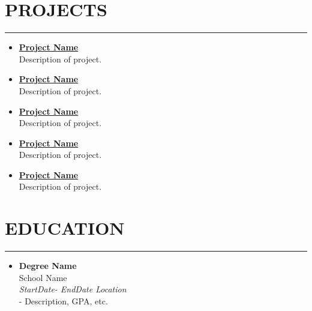\documentclass[11 pt, a4paper, usenames, dvipsnames]{article}
\newcommand*{\RoleFont}{%
      \fontsize{14}{8}%
\color{Black}%
\bf
      \selectfont}
\newcommand*{\DateFont}{%
      \fontsize{10}{8}%
\color{Gray}%
\it
      \selectfont}
\newcommand*{\SectionFont}{%
      \fontsize{16}{5}%
\color{CV_Color}%
\bf
\selectfont}
\begin{document}
\begin{paracol}{2}
\section*{\SectionFont\faPaperPlane\enskip PROJECTS}\vspace{-15pt}
\par\noindent\rule{0.18\textwidth}{0.4pt}\vspace{-1pt}

\begin{itemize}[leftmargin=0pt,align=left,labelwidth=\parindent,labelsep=0pt]

\item[] \href{https://github.com/}{\textbf{Project Name}} \verb||\faGithub\enskip \\ 
Description of project.

\item[] \href{https://github.com/}{\textbf{Project Name}} \verb||\faGithub\enskip \\ 
Description of project.

\item[] \href{https://github.com/}{\textbf{Project Name}} \verb||\faGithub\enskip \\ 
Description of project.

\item[] \href{https://github.com/}{\textbf{Project Name}} \verb||\faGithub\enskip \\ 
Description of project.

\item[] \href{https://github.com/}{\textbf{Project Name}} \verb||\faGithub\enskip \\ 
Description of project.
\end{itemize}


\switchcolumn[1]


\section*{\SectionFont\faMortarBoard\enskip EDUCATION}\vspace{-15pt}
\par\noindent\rule{0.22\textwidth}{0.4pt} \vspace{0.4pt}
\begin{itemize}[leftmargin=0pt,align=left,labelwidth=\parindent,labelsep=0pt]
\item[] {\RoleFont Degree Name} \\
\normalfont School Name \\
{\DateFont StartDate- EndDate \hfill Location }\\
{\color{CV_Color}\LARGE - } Description, GPA, etc.



\end{itemize}
\end{paracol}
\end{document}
